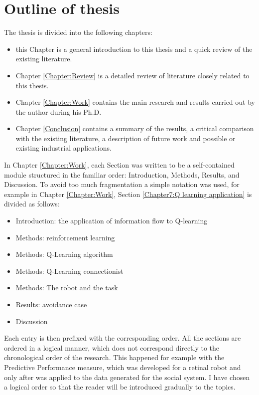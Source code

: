 \section{Outline of thesis}
The thesis is divided into the following chapters:
\begin{itemize}
 \item this Chapter is a general introduction to this thesis
and a quick review of the existing literature.
 \item Chapter \ref{Chapter:Review} is a detailed review of literature closely related to this thesis.
 \item Chapter \ref{Chapter:Work} contains the main research and results
carried out by the author during his Ph.D.
 \item Chapter \ref{Conclusion} contains a summary of the results, a critical
comparison with the existing literature, a description of future work
and possible or existing industrial applications.
\end{itemize}

In Chapter \ref{Chapter:Work}, each Section was written to be a self-contained
module structured in the familiar order: Introduction, Methods, Results, and Discussion.
To avoid too much fragmentation a simple notation was used, for example in 
Chapter \ref{Chapter:Work}, Section \ref{Chapter7:Q learning application} 
is divided as follows:
\begin{itemize}
 \item Introduction: the application of information flow to Q-learning
 \item Methods: reinforcement learning
 \item Methods: Q-Learning algorithm
 \item Methods: Q-Learning connectionist
 \item Methods: The robot and the task
 \item Results: avoidance case
 \item Discussion
\end{itemize}
Each entry is then prefixed with the corresponding order.
All the sections are ordered in a logical manner, which does not correspond directly
to the chronological order of the research.
This happened for example with the Predictive Performance measure, which was
developed for a retinal robot and only after was applied to the data generated for
 the social system.
I have chosen a logical order so that the reader will be introduced gradually
to the topics.


